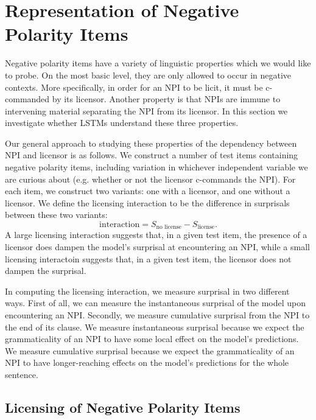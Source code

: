 \documentclass[11pt, round]{article}
\begin{document}
\section{Representation of Negative Polarity Items}

Negative polarity items have a variety of linguistic properties which we would like to probe. On the most basic level, they are only allowed to occur in negative contexts. More specifically, in order for an NPI to be licit, it must be c-commanded by its licensor. Another property is that NPIs are immune to intervening material separating the NPI from its licensor. In this section we  investigate whether LSTMs understand these three properties.

Our general approach to studying these properties of the dependency between NPI and licensor is as follows. We construct a number of test items containing negative polarity items, including variation in whichever independent variable we are curious about (e.g. whether or not the licensor c-commands the NPI). For each item, we construct two variants: one with a licensor, and one without a licensor. We define the licensing interaction to be the difference in surprisals between these two variants:
\[ \textrm{interaction} = S_{\textrm{no license}} - S_{\textrm{license}}. \]
A large licensing interaction suggests that, in a given test item, the presence of a licensor does dampen the model's surprisal at encountering an NPI, while a small licensing interactoin suggests that, in a given test item, the licensor does not dampen the surprisal.

In computing the licensing interaction, we measure surprisal in two different ways. First of all, we can measure the instantaneous surprisal of the model upon encountering an NPI. Secondly, we measure cumulative surprisal from the NPI to the end of its clause. We measure instantaneous surprisal because we expect the grammaticality of an NPI to have some local effect on the model's predictions. We measure cumulative surprisal because we expect the grammaticality of an NPI to have longer-reaching effects on the model's predictions for the whole sentence.

\subsection{Licensing of Negative Polarity Items}
\label{sec:basic}
\end{document}

